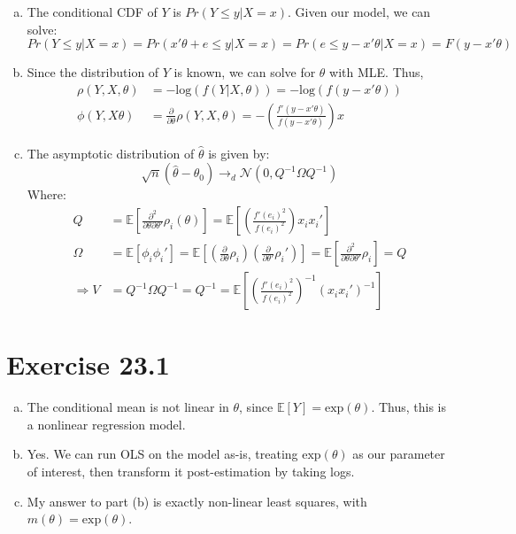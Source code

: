 \documentclass{article}
\newcommand{\N}{\mathcal{N}}
\newcommand{\loge}[1]{\text{log}\left(#1\right)}
\newcommand{\E}[1]{\mathbb{E}\left[#1\right]}%
\begin{document}
\begin{enumerate}[(a)]
	\item The conditional CDF of $Y$ is $Pr(Y\leq y|X=x)$. Given our model, we can solve:
		\[
			Pr(Y\leq y|X=x) = Pr(x'\theta + e\leq y|X=x) = Pr(e\leq y - x'\theta|X=x) = F(y-x'\theta)
		\]
	
	\item Since the distribution of $Y$ is known, we can solve for $\theta$ with MLE. Thus,
		\begin{align*}
			\rho(Y,X,\theta)	&= -\loge{f(Y|X,\theta)} = -\loge{f(y-x'\theta)}	\\
			\phi(Y,X\theta)		&= \frac{\partial}{\partial\theta}\rho(Y,X,\theta) = -\left(\frac{f'(y-x'\theta)}{f(y-x'\theta)}\right)x
		\end{align*}
	
	\item The asymptotic distribution of $\hat{\theta}$ is given by:
		\[
			\sqrt{n}(\hat{\theta}-\theta_0) \rightarrow_d \N\left(0,Q^{-1}\Omega Q^{-1}\right)
		\]
		Where:
		\begin{align*}
					Q		&= \E{\frac{\partial^2}{\partial\theta\partial\theta'}\rho_i(\theta)} = \E{\left(\frac{f'(e_i)^2}{f(e_i)^2}\right)x_ix_i'}		\\
					\Omega 	&= \E{\phi_i\phi_i'} = \E{\left(\frac{\partial}{\partial\theta}\rho_i\right)\left(\frac{\partial}{\partial\theta'}\rho_i'\right)}	
								= \E{\frac{\partial^2}{\partial\theta\partial\theta'}\rho_i} = Q																\\
			\Rightarrow V	&= Q^{-1}\Omega Q^{-1} = Q^{-1} = \E{\left(\frac{f'(e_i)^2}{f(e_i)^2}\right)^{-1}(x_ix_i')^{-1}}
		\end{align*}
	
\end{enumerate}


\section*{Exercise 23.1}

\begin{enumerate}[(a)]
	\item The conditional mean is not linear in $\theta$, since $\E{Y} = \text{exp}(\theta)$. Thus, this is a nonlinear regression model.
	
	\item Yes. We can run OLS on the model as-is, treating $\text{exp}(\theta)$ as our parameter of interest, then transform it post-estimation by taking logs.
	
	\item My answer to part (b) is exactly non-linear least squares, with ${m(\theta)=\text{exp}(\theta)}$.
	
\end{enumerate}
\end{document}
